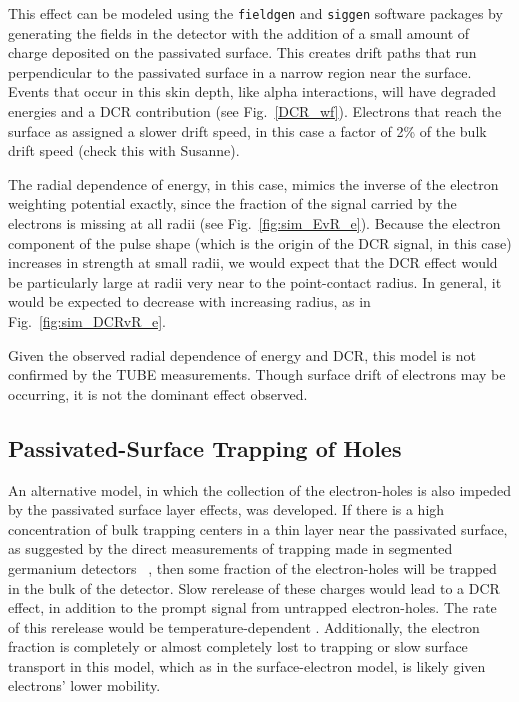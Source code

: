 \documentclass[groupedaddress,rmp,amsmath,amssymb,bibnotes,altaffilletter,twocolumn]{revtex4-1}
\begin{document}
This effect can be modeled using the {\tt fieldgen} and {\tt siggen} software packages by generating the fields in the detector with the addition of a small amount of charge deposited on the passivated surface. This creates drift paths that run perpendicular to the passivated surface in a narrow region near the surface. Events that occur in this skin depth, like alpha interactions, will have degraded energies and a DCR contribution (see Fig.~\ref{DCR_wf}). Electrons that reach the surface as assigned a slower drift speed, in this case a factor of 2\% of the bulk drift speed (check this with Susanne). 

The radial dependence of energy, in this case, mimics the inverse of the electron weighting potential exactly, since the fraction of the signal carried by the electrons is missing at all radii (see Fig.~\ref{fig:sim_EvR_e}). Because the electron component of the pulse shape (which is the origin of the DCR signal, in this case) increases in strength at small radii, we would expect that the DCR effect would  be particularly large at radii very near to the point-contact radius. In general, it would be expected to decrease with increasing radius, as in Fig.~\ref{fig:sim_DCRvR_e}. 

Given the observed radial dependence of energy and DCR, this model is not confirmed by the TUBE measurements. Though surface drift of electrons may be occurring, it is not the dominant effect observed. 

\subsection{Passivated-Surface Trapping of Holes}
An alternative model, in which the collection of the electron-holes is also impeded by the passivated surface layer effects, was developed. If there is a high concentration of bulk trapping centers in a thin layer near the passivated surface, as suggested by the direct measurements of trapping made in segmented germanium detectors ~\cite{Abt2017}, then some fraction of the electron-holes will be trapped in the bulk of the detector. Slow rerelease of these charges would lead to a DCR effect, in addition to the prompt signal from untrapped electron-holes. The rate of this rerelease would be temperature-dependent \cite{?}. Additionally, the electron fraction is completely or almost completely lost to trapping or slow surface transport in this model, which as in the surface-electron model, is likely given electrons' lower mobility. 
\end{document}
